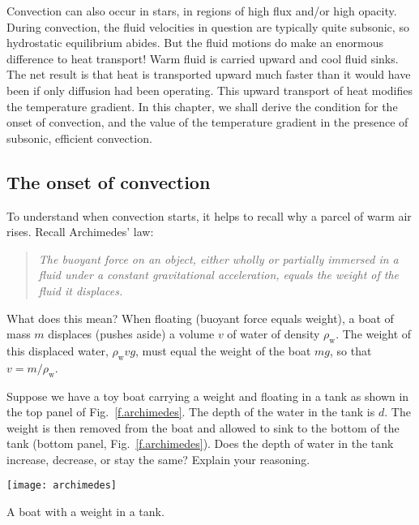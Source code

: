 Convection can also occur in stars, in regions of high flux and/or high opacity. During convection, the fluid velocities in question are typically quite subsonic, so hydrostatic equilibrium abides. But the fluid motions do make an enormous difference to heat transport! Warm fluid is carried upward and cool fluid sinks. The net result is that heat is transported upward much faster than it would have been if only diffusion had been operating. This upward transport of heat modifies the temperature gradient. In this chapter, we shall derive the condition for the onset of convection, and the value of the temperature gradient in the presence of subsonic, efficient convection.

\subsection{The onset of convection}\label{s.convection-onset}

To understand when convection starts, it helps to recall why a parcel of warm air rises. Recall Archimedes' law:
\begin{quote}\itshape
The buoyant force on an object, either wholly or partially immersed in a fluid under a constant gravitational acceleration, equals the weight of the fluid it displaces.
\end{quote}
What does this mean? When floating (buoyant force equals weight), a boat of mass $m$ displaces (pushes aside) a volume $v$ of water of density $\rho_{\mathrm{w}}$. The weight of this displaced water, $\rho_{\mathrm{w}}v g$, must equal the weight of the boat $mg$, so that $v = m/\rho_{\mathrm{w}}$.

\begin{exercisebox}
Suppose we have a toy boat carrying a weight and floating in a tank as shown in the top panel of Fig.~\ref{f.archimedes}. The depth of the water in the tank is $d$. The weight is then removed from the boat and allowed to sink to the bottom of the tank (bottom panel, Fig.~\ref{f.archimedes}). Does the depth of water in the tank increase, decrease, or stay the same? Explain your reasoning.
\end{exercisebox}
\begin{marginfigure}[-6\baselineskip]
\texttt{[image: archimedes]}
\caption[A boat with a weight]{\label{f.archimedes} A boat with a weight in a tank.}
\end{marginfigure}


